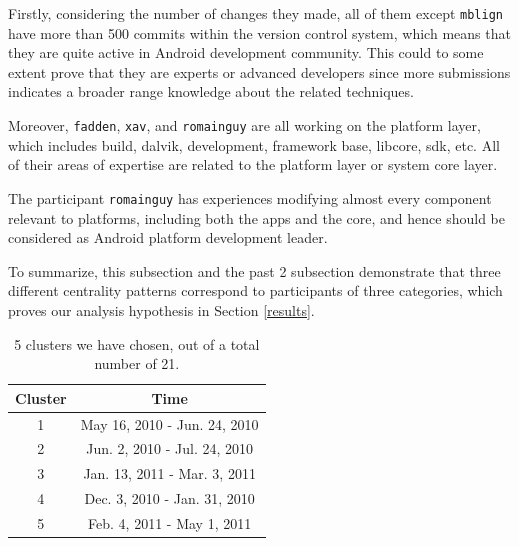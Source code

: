 \documentclass[10pt, conference, compsocconf]{IEEEtran}
\begin{document}
Firstly, considering the number of changes they made, all of them
except \texttt{mblign} have more than 500 commits within the
version control system,
which means that they are quite active in Android
development community. This could to some extent prove that they are
experts or advanced developers since more submissions indicates a
 broader range knowledge about the related techniques.


Moreover, \texttt{fadden}, \texttt{xav}, and \texttt{romainguy} are
all working on the platform layer,
which includes build, dalvik, development, framework base, libcore,
sdk, etc. All of their areas of expertise are related to the platform layer or
system core layer.

The participant \texttt{romainguy} has experiences modifying almost every
component relevant to platforms, including both the apps and the core, and
hence should be considered as Android platform development leader.


To summarize, this subsection and the past 2 subsection demonstrate
that three different centrality patterns correspond to
participants of three categories, which proves our analysis hypothesis
in Section \ref{results}.


\begin{table}[!t]
\centering
\caption{5 clusters we have chosen, out of a total number of 21.}
\begin{tabular}{|c|c|}
\hline
Cluster & Time  \\
\hline
1 & May 16, 2010 - Jun. 24, 2010 \\
\hline
2 & Jun. 2, 2010 - Jul. 24, 2010  \\
\hline
3 & Jan. 13, 2011 - Mar. 3, 2011 \\
\hline
4 & Dec. 3, 2010 - Jan. 31, 2010 \\
\hline
5 & Feb. 4, 2011 - May 1, 2011 \\
\hline
\end{tabular}
\label{cluster_list}
\end{table}
\end{document}
